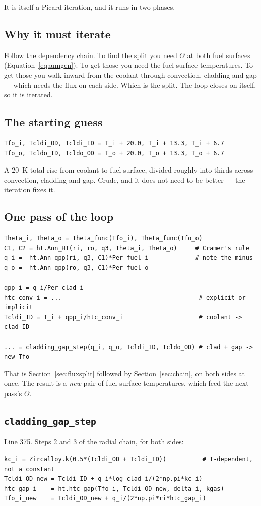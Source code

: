 \documentclass[11pt]{article}
\newcommand{\code}[1]{\texttt{#1}}
\begin{document}
It is itself a Picard iteration, and it runs in two phases.

\subsection{Why it must iterate}

Follow the dependency chain. To find the split you need $\Theta$ at both fuel surfaces
(Equation~\eqref{eq:anngen}). To get those you need the fuel surface temperatures. To get
those you walk inward from the coolant through convection, cladding and gap --- which
needs the flux on each side. Which is the split. The loop closes on itself, so it is
iterated.

\subsection{The starting guess}
\begin{lstlisting}
Tfo_i, Tcldi_OD, Tcldi_ID = T_i + 20.0, T_i + 13.3, T_i + 6.7
Tfo_o, Tcldo_ID, Tcldo_OD = T_o + 20.0, T_o + 13.3, T_o + 6.7
\end{lstlisting}
A 20~K total rise from coolant to fuel surface, divided roughly into thirds across
convection, cladding and gap. Crude, and it does not need to be better --- the iteration
fixes it.

\subsection{One pass of the loop}
\begin{lstlisting}
Theta_i, Theta_o = Theta_func(Tfo_i), Theta_func(Tfo_o)
C1, C2 = ht.Ann_HT(ri, ro, q3, Theta_i, Theta_o)     # Cramer's rule
q_i = -ht.Ann_qpp(ri, q3, C1)*Per_fuel_i             # note the minus
q_o =  ht.Ann_qpp(ro, q3, C1)*Per_fuel_o

qpp_i = q_i/Per_clad_i
htc_conv_i = ...                                      # explicit or implicit
Tcldi_ID = T_i + qpp_i/htc_conv_i                     # coolant -> clad ID

... = cladding_gap_step(q_i, q_o, Tcldi_ID, Tcldo_OD) # clad + gap -> new Tfo
\end{lstlisting}

That is Section~\ref{sec:fluxsplit} followed by Section~\ref{sec:chain}, on both sides at
once. The result is a \emph{new} pair of fuel surface temperatures, which feed the next
pass's $\Theta$.

\subsection{\code{cladding\_gap\_step}}
Line 375. Steps 2 and 3 of the radial chain, for both sides:
\begin{lstlisting}
kc_i = Zircalloy.k(0.5*(Tcldi_OD + Tcldi_ID))          # T-dependent, not a constant
Tcldi_OD_new = Tcldi_ID + q_i*log_clad_i/(2*np.pi*kc_i)
htc_gap_i    = ht.htc_gap(Tfo_i, Tcldi_OD_new, delta_i, kgas)
Tfo_i_new    = Tcldi_OD_new + q_i/(2*np.pi*ri*htc_gap_i)
\end{lstlisting}
\end{document}
